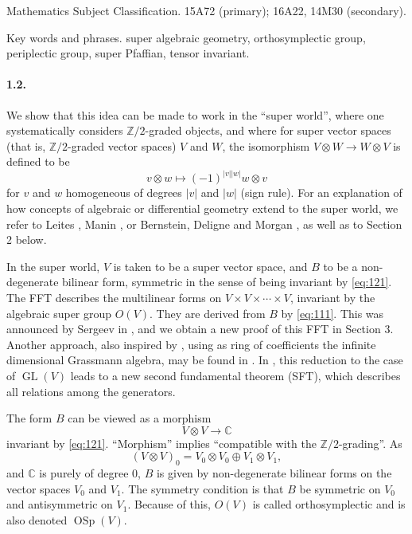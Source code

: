 \documentclass[11pt]{article}
\newcommand{\C}{\mathbb C}
\newcommand{\Z}{\mathbb Z}
\newcommand{\GL}{\operatorname{GL}}
\newcommand{\OSp}{\operatorname{OSp}}
\begin{document}
\medskip
{} Mathematics Subject Classification. 15A72 (primary); 16A22, 14M30 (secondary).\par
\noindent Key words and phrases. super algebraic geometry, orthosymplectic group, periplectic group, super Pfaffian, tensor invariant.

\paragraph{1.2.}
We show that this idea can be made to work in the ``super world'', where one systematically considers $\Z/2$-graded objects, and where for super vector spaces (that is, $\Z/2$-graded vector spaces) $V$ and $W$, the isomorphism $V\otimes W\to W\otimes V$ is defined to be
\begin{equation}
\label{eq:121}
v\otimes w\longmapsto (-1)^{|v||w|}w\otimes v
\end{equation}
for $v$ and $w$ homogeneous of degrees $|v|$ and $|w|$ (sign rule). For an explanation of how concepts of algebraic or differential geometry extend to the super world, we refer to Leites \cite{Lei90}, Manin \cite{Man88}, or Bernstein, Deligne and Morgan \cite{DM99}, as well as to Section 2 below.

In the super world, $V$ is taken to be a super vector space, and $B$ to be a non-degenerate bilinear form, symmetric in the sense of being invariant by \eqref{eq:121}. The FFT describes the multilinear forms on $V\times V\times\cdots\times V$, invariant by the algebraic super group $O(V)$. They are derived from $B$ by \eqref{eq:111}. This was announced by Sergeev in \cite{Ser92}, and we obtain a new proof of this FFT in Section 3. Another approach, also inspired by \cite{ABP73}, using as ring of coefficients the infinite dimensional Grassmann algebra, may be found in \cite{LZ14a}. In \cite{LZ14b}, this reduction to the case of $\GL(V)$ leads to a new second fundamental theorem (SFT), which describes all relations among the generators.

The form $B$ can be viewed as a morphism
\[
V\otimes V\longrightarrow \C
\]
invariant by \eqref{eq:121}. ``Morphism'' implies ``compatible with the $\Z/2$-grading''. As
\[
(V\otimes V)_0=V_0\otimes V_0\oplus V_1\otimes V_1,
\]
and $\C$ is purely of degree $0$, $B$ is given by non-degenerate bilinear forms on the vector spaces $V_0$ and $V_1$. The symmetry condition is that $B$ be symmetric on $V_0$ and antisymmetric on $V_1$. Because of this, $O(V)$ is called orthosymplectic and is also denoted $\OSp(V)$.
\end{document}
